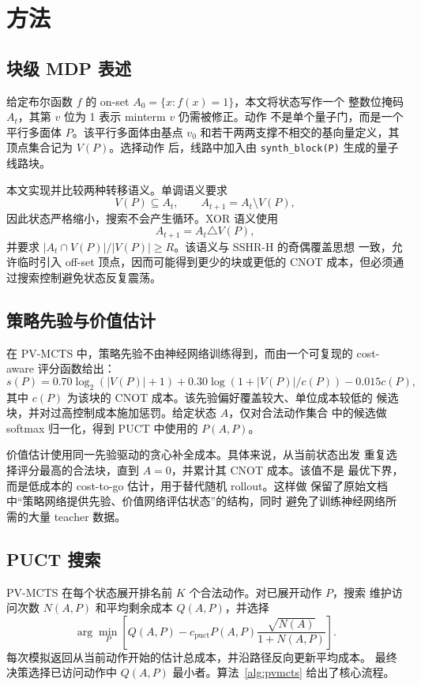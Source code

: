\documentclass[11pt,letterpaper]{ctexart}
\begin{document}
\section{方法}

\subsection{块级 MDP 表述}

给定布尔函数 $f$ 的 on-set $A_0=\{x:f(x)=1\}$，本文将状态写作一个
整数位掩码 $A_t$，其第 $v$ 位为 1 表示 minterm $v$ 仍需被修正。动作
不是单个量子门，而是一个平行多面体 $P$。该平行多面体由基点 $v_0$
和若干两两支撑不相交的基向量定义，其顶点集合记为 $V(P)$。选择动作
后，线路中加入由 \texttt{synth\_block(P)} 生成的量子线路块。

本文实现并比较两种转移语义。单调语义要求
\[
  V(P)\subseteq A_t,\qquad A_{t+1}=A_t\setminus V(P),
\]
因此状态严格缩小，搜索不会产生循环。XOR 语义使用
\[
  A_{t+1}=A_t \triangle V(P),
\]
并要求 $|A_t\cap V(P)|/|V(P)|\ge R$。该语义与 SSHR-H 的奇偶覆盖思想
一致，允许临时引入 off-set 顶点，因而可能得到更少的块或更低的 CNOT
成本，但必须通过搜索控制避免状态反复震荡。

\subsection{策略先验与价值估计}

在 PV-MCTS 中，策略先验不由神经网络训练得到，而由一个可复现的
cost-aware 评分函数给出：
\[
  s(P)=0.70\log_2(|V(P)|+1)+0.30\log(1+|V(P)|/c(P))-0.015c(P),
\]
其中 $c(P)$ 为该块的 CNOT 成本。该先验偏好覆盖较大、单位成本较低的
候选块，并对过高控制成本施加惩罚。给定状态 $A$，仅对合法动作集合
中的候选做 softmax 归一化，得到 PUCT 中使用的 $P(A,P)$。

价值估计使用同一先验驱动的贪心补全成本。具体来说，从当前状态出发
重复选择评分最高的合法块，直到 $A=0$，并累计其 CNOT 成本。该值不是
最优下界，而是低成本的 cost-to-go 估计，用于替代随机 rollout。这样做
保留了原始文档中“策略网络提供先验、价值网络评估状态”的结构，同时
避免了训练神经网络所需的大量 teacher 数据。

\subsection{PUCT 搜索}

PV-MCTS 在每个状态展开排名前 $K$ 个合法动作。对已展开动作 $P$，搜索
维护访问次数 $N(A,P)$ 和平均剩余成本 $Q(A,P)$，并选择
\[
  \arg\min_P \left[
    Q(A,P)-c_{\mathrm{puct}}P(A,P)\frac{\sqrt{N(A)}}{1+N(A,P)}
  \right].
\]
每次模拟返回从当前动作开始的估计总成本，并沿路径反向更新平均成本。
最终决策选择已访问动作中 $Q(A,P)$ 最小者。算法~\ref{alg:pvmcts}
给出了核心流程。
\end{document}
